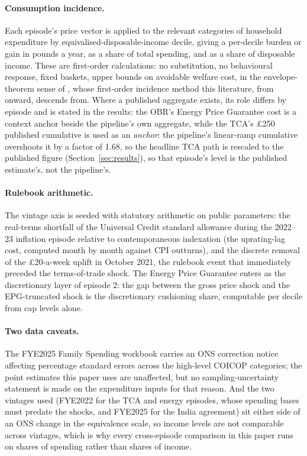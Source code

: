 \paragraph{Consumption incidence.} Each episode's price vector is
applied to the relevant categories of household expenditure by
equivalised-disposable-income decile, giving a per-decile burden or
gain in pounds a year, as a share of total spending, and as a share of
disposable income. These are first-order calculations: no substitution,
no behavioural response, fixed baskets, upper bounds on avoidable
welfare cost, in the envelope-theorem sense of \citet{deaton1989},
whose first-order incidence method this literature, from
\citet{fajgelbaumkhandelwal2016} onward, descends from.
Where a published aggregate exists, its role differs by episode and is
stated in the results: the OBR's Energy Price Guarantee cost is a
context anchor beside the pipeline's own aggregate, while the TCA's
\pounds 250 published cumulative is used as an \emph{anchor}: the
pipeline's linear-ramp cumulative overshoots it by a factor of 1.68,
so the headline TCA path is rescaled to the published figure
(Section~\ref{sec:results}), so that episode's level is the published
estimate's, not the pipeline's.

\paragraph{Rulebook arithmetic.} The vintage axis is seeded with
statutory arithmetic on public parameters: the real-terms shortfall of
the Universal Credit standard allowance during the 2022--23 inflation
episode relative to contemporaneous indexation (the uprating-lag cost,
computed month by month against CPI outturns), and the discrete
removal of the \pounds 20-a-week uplift in October 2021, the rulebook
event that immediately preceded the terms-of-trade shock. The
Energy Price Guarantee enters as the discretionary layer of episode 2:
the gap between the gross price shock and the EPG-truncated shock is
the discretionary cushioning share, computable per decile from cap
levels alone.

\paragraph{Two data caveats.} The FYE2025 Family Spending workbook
carries an ONS correction notice affecting percentage standard errors
across the high-level COICOP categories; the point estimates this paper
uses are unaffected, but no sampling-uncertainty statement is made on
the expenditure inputs for that reason. And the two vintages used
(FYE2022 for the TCA and energy episodes, whose spending bases must
predate the shocks, and FYE2025 for the India agreement) sit either
side of an ONS change in the equivalence scale, so income levels are
not comparable across vintages, which is why every cross-episode
comparison in this paper runs on shares of spending rather than shares
of income.

